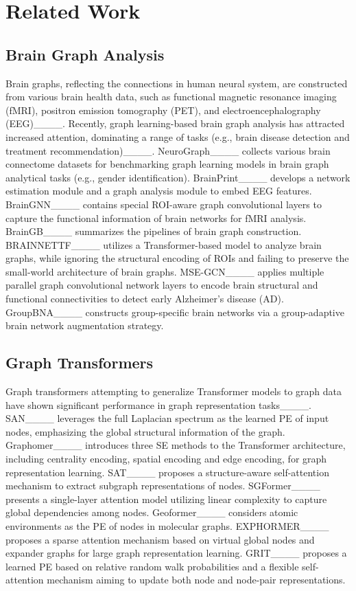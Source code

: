 \section{Related Work}
\subsection{Brain Graph Analysis}

Brain graphs, reflecting the connections in human neural system, are constructed from various brain health data, such as functional magnetic resonance imaging (fMRI), positron emission tomography (PET), and electroencephalography (EEG)____. Recently, graph learning-based brain graph analysis has attracted increased attention, dominating a range of tasks (e.g., brain disease detection and treatment recommendation)____. NeuroGraph____ collects various brain connectome datasets for benchmarking graph learning models in brain graph analytical tasks (e.g., gender identification). BrainPrint____ develops a network estimation module and a graph analysis module to embed EEG features. 
BrainGNN____ contains special ROI-aware graph convolutional layers to capture the functional information of brain networks for fMRI analysis. %
BrainGB____ summarizes the pipelines of brain graph construction. BRAINNETTF____ utilizes a Transformer-based model to analyze brain graphs, while ignoring the structural encoding of ROIs and failing to preserve the small-world architecture of brain graphs. MSE-GCN____ applies multiple parallel graph convolutional network layers to encode brain structural and functional connectivities to detect early Alzheimer’s disease (AD). GroupBNA____ constructs group-specific brain networks via a group-adaptive brain network augmentation strategy.


\subsection{Graph Transformers}

Graph transformers attempting to generalize Transformer models to graph data have shown significant performance in graph representation tasks____. SAN____ leverages the full Laplacian spectrum as the learned PE of input nodes, emphasizing the global structural information of the graph. Graphomer____ introduces three SE methods to the Transformer architecture, including centrality encoding, spatial encoding and edge encoding, for graph representation learning. SAT____ proposes a structure-aware self-attention mechanism to extract subgraph representations of nodes. SGFormer____ presents a single-layer attention model utilizing linear complexity to capture global dependencies among nodes. Geoformer____ considers atomic environments as the PE of nodes in molecular graphs. EXPHORMER____ proposes a sparse attention mechanism based on virtual global nodes and expander graphs for large graph representation learning. GRIT____ proposes a learned PE based on relative random walk probabilities and a flexible self-attention mechanism aiming to update both node and node-pair representations.
